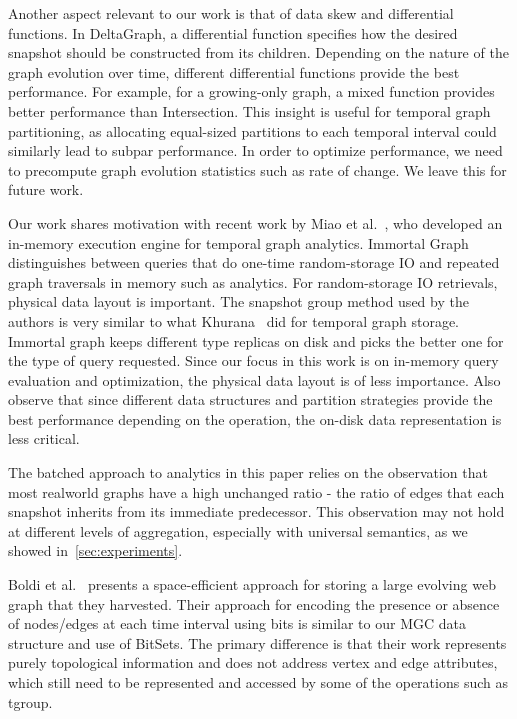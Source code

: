Another aspect relevant to our work is that of data skew and
differential functions.  In DeltaGraph, a differential function
specifies how the desired snapshot should be constructed from its
children.  Depending on the nature of the graph evolution over time,
different differential functions provide the best performance.  For
example, for a growing-only graph, a mixed function provides better
performance than Intersection.  This insight is useful for temporal
graph partitioning, as allocating equal-sized partitions to each
temporal interval could similarly lead to subpar performance.  In order
to optimize performance, we need to precompute graph evolution
statistics such as rate of change.  We leave this for future
work. 

Our work shares motivation with recent work by Miao et
al.~\cite{DBLP:journals/tos/MiaoHLWYZPCC15}, who developed an
in-memory execution engine for temporal graph analytics.  Immortal
Graph distinguishes between queries that do one-time random-storage IO
and repeated graph traversals in memory such as analytics.  For
random-storage IO retrievals, physical data layout is important.  The
snapshot group method used by the authors is very similar to what
Khurana~\cite{Khurana2013} did for temporal graph storage.  Immortal
graph keeps different type replicas on disk and picks the better one
for the type of query requested.  Since our focus in this work is on
in-memory query evaluation and optimization, the physical data layout
is of less importance.  Also observe that since different data
structures and partition strategies provide the best performance
depending on the operation, the on-disk data representation is less
critical. 

The batched approach to analytics in this paper relies on the
observation that most realworld graphs have a high unchanged ratio -
the ratio of edges that each snapshot inherits from its immediate
predecessor.  This observation may not hold at different levels of
aggregation, especially with universal semantics, as we showed
in~\ref{sec:experiments}.

Boldi et al.~\cite{Boldi2008} presents a space-efficient approach for
storing a large evolving web graph that they harvested.  Their
approach for encoding the presence or absence of nodes/edges at each
time interval using bits is similar to our MGC data structure and use
of BitSets.  The primary difference is that their work represents
purely topological information and does not address vertex and edge
attributes, which still need to be represented and accessed by some of
the operations such as tgroup.

